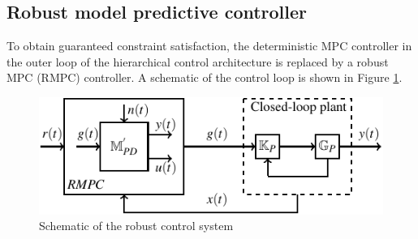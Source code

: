 \documentclass[letterpaper, 10 pt, conference]{ieeeconf}  %
\begin{document}
	\subsection{Robust model predictive controller}
	To obtain guaranteed constraint satisfaction, the deterministic MPC controller in the outer loop of the hierarchical control architecture is replaced by a robust MPC (RMPC) controller. A schematic of the control loop is shown in Figure \ref{fullloop}. 
	\begin{figure}[h]
		\vspace{-3pt}
		\hspace{20pt}
		\includegraphics[scale = 0.9]{final_robust.pdf}
		\caption{Schematic of the robust control system}
		\label{fullloop}
	\end{figure} 
	
\end{document}
